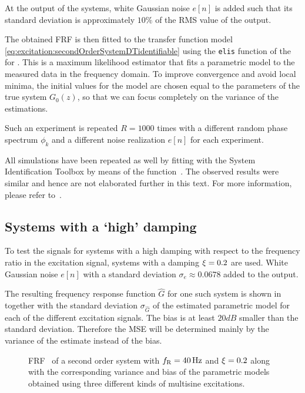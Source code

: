   At the output of the systems, white Gaussian noise $e[n]$ is added such that its standard deviation is approximately $10\%$ of the RMS value of the output.

  
  The obtained FRF is then fitted to the transfer function model \eqref{eq:excitation:secondOrderSystemDTidentifiable} using the \texttt{elis} function of the \FDIDENT~\citep{FDIDENT} for \MATLAB.
  This is a maximum likelihood estimator that fits a parametric model to the measured data in the frequency domain.
  To improve convergence and avoid local minima, the initial values for the model are chosen equal to the parameters of the true system $G_0(z)$, so that we can focus completely on the variance of the estimations.

  Such an experiment is repeated $R=1000$ times with a different random phase  spectrum $\phi_k$ and a different noise realization $e[n]$ for each experiment.

  \begin{remark}
  All simulations  have been repeated as well by fitting with the \MATLAB System Identification Toolbox by means of the  function~\citep{TDIDENT}.
  The observed results were similar and hence are not elaborated further in this text.
  For more information, please refer to~\citep{Larsson2012SYSID}.
  \end{remark}

  \subsection{Systems with a `high' damping}
  To test the signals for systems with a high damping with respect to the frequency ratio in the excitation signal, systems with a damping $\xi_{} = 0.2$ are used.
  White Gaussian noise $e[n]$ with a standard deviation $\sigma_e \approx 0.0678$ added to the output.

  The resulting frequency response function $\hat{G}$ for one such system is shown in  together with the standard deviation $\sigma_{\hat{G}}$ of the estimated parametric model for each of the different excitation signals.
  The bias is at least $20\unit{dB}$ smaller than the standard  deviation.
  Therefore the \gls{MSE} will be determined mainly by the variance of the estimate instead of the bias.

  \begin{figure}[th]
    \centering
      \setlength{}
      \setlength\figureheight{0.68\figurewidth}
    
    \caption[Simulated \gls{FRF} and its variance for different excitation signals.]{\gls{FRF}~ of a second order system with $f_{\mathrm{R}}=40\,\mathrm{Hz}$ and $\xi_{}=0.2$ along with the corresponding variance and bias of the parametric models obtained using three different kinds of multisine excitations.}%
    \label{fig:excitation:FRF1}
  \end{figure}

